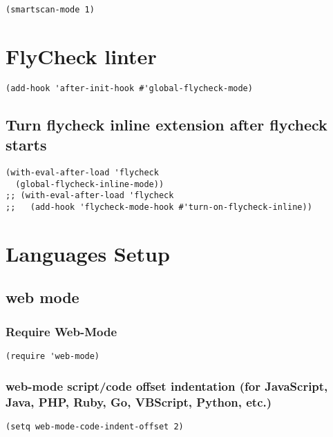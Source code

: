 \documentclass[11pt]{article}
\begin{document}
\begin{verbatim}
(smartscan-mode 1)
\end{verbatim}

\section*{FlyCheck linter}
\label{sec:orgc078652}

\begin{verbatim}
(add-hook 'after-init-hook #'global-flycheck-mode)
\end{verbatim}

\subsection*{Turn flycheck inline extension after flycheck starts}
\label{sec:org05bd1d7}

\begin{verbatim}
(with-eval-after-load 'flycheck
  (global-flycheck-inline-mode))
;; (with-eval-after-load 'flycheck
;;   (add-hook 'flycheck-mode-hook #'turn-on-flycheck-inline))
\end{verbatim}



\section*{Languages Setup}
\label{sec:orge00b4c0}

\subsection*{web mode}
\label{sec:org040cbce}

\subsubsection*{Require Web-Mode}
\label{sec:orgadfe77f}
\begin{verbatim}
(require 'web-mode)
\end{verbatim}

\subsubsection*{web-mode script/code offset indentation (for JavaScript, Java, PHP, Ruby, Go, VBScript, Python, etc.)}
\label{sec:org2fa8f84}
\begin{verbatim}
(setq web-mode-code-indent-offset 2)
\end{verbatim}
\end{document}
